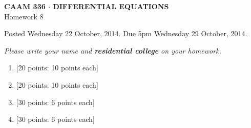 \documentclass[10pt]{article}
\begin{document}
\vspace*{-5em}
\begin{center}
\large \textsf{\textbf{CAAM 336 $\cdot$ DIFFERENTIAL EQUATIONS}\\[0.5em]
Homework 8 }
\end{center}

Posted Wednesday 22 October, 2014.  Due 5pm Wednesday 29 October, 2014.
\begin{center}
\emph{Please write your name and \textbf{residential college} on your homework.}
\end{center}

\begin{enumerate}
\item {[20 points: 10 points each]}\\ 
\newpage
\item {[20 points: 10 points each]}\\  
\newpage
\item {[30 points: 6 points each]}\\  
\newpage
\item {[30 points: 6 points each]}\\  
\newpage


\end{enumerate}
\end{document}

